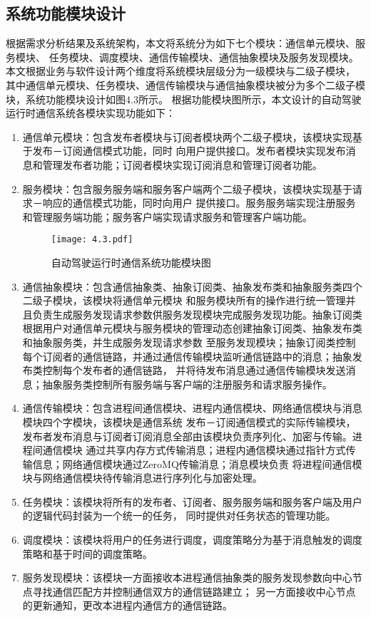 \subsection{系统功能模块设计}
根据需求分析结果及系统架构，本文将系统分为如下七个模块：通信单元模块、服务模块、
任务模块、调度模块、通信传输模块、通信抽象模块及服务发现模块。本文根据业务与软件设计两个维度将系统模块层级分为一级模块与二级子模块，
其中通信单元模块、任务模块、通信传输模块与通信抽象模块被分为多个二级子模块，系统功能模块设计如图4.3所示。
根据功能模块图所示，本文设计的自动驾驶运行时通信系统各模块实现功能如下：
\begin{enumerate}
  \item 通信单元模块：包含发布者模块与订阅者模块两个二级子模块，该模块实现基于发布－订阅通信模式功能，同时
  向用户提供接口。发布者模块实现发布消息和管理发布者功能；订阅者模块实现订阅消息和管理订阅者功能。
  \item 服务模块：包含服务服务端和服务客户端两个二级子模块，该模块实现基于请求－响应的通信模式功能，同时向用户
  提供接口。服务服务端实现注册服务和管理服务端功能；服务客户端实现请求服务和管理客户端功能。
  \begin{figure}[H]
    \centering
    \texttt{[image: 4.3.pdf]}
    \caption{自动驾驶运行时通信系统功能模块图}
    \label{fig:22}
  \end{figure}
  \item 通信抽象模块：包含通信抽象类、抽象订阅类、抽象发布类和抽象服务类四个二级子模块，该模块将通信单元模块
  和服务模块所有的操作进行统一管理并且负责生成服务发现请求参数供服务发现模块完成服务发现功能。抽象订阅类
  根据用户对通信单元模块与服务模块的管理动态创建抽象订阅类、抽象发布类和抽象服务类，并生成服务发现请求参数
  至服务发现模块；抽象订阅类控制每个订阅者的通信链路，并通过通信传输模块监听通信链路中的消息；抽象发布类控制每个发布者的通信链路，
  并将待发布消息通过通信传输模块发送消息；抽象服务类控制所有服务端与客户端的注册服务和请求服务操作。
  \item 通信传输模块：包含进程间通信模块、进程内通信模块、网络通信模块与消息模块四个字模块，该模块是通信系统
  发布－订阅通信模式的实际传输模块，发布者发布消息与订阅者订阅消息全部由该模块负责序列化、加密与传输。进程间通信模块
  通过共享内存方式传输消息；进程内通信模块通过指针方式传输信息；网络通信模块通过ZeroMQ传输消息；消息模块负责
  将进程间通信模块与网络通信模块待传输消息进行序列化与加密处理。
  \item 任务模块：该模块将所有的发布者、订阅者、服务服务端和服务客户端及用户的逻辑代码封装为一个统一的任务，
  同时提供对任务状态的管理功能。
  \item 调度模块：该模块将用户的任务进行调度，调度策略分为基于消息触发的调度策略和基于时间的调度策略。
  \item 服务发现模块：该模块一方面接收本进程通信抽象类的服务发现参数向中心节点寻找通信匹配方并控制通信双方的通信链路建立；
  另一方面接收中心节点的更新通知，更改本进程内通信方的通信链路。
\end{enumerate}


